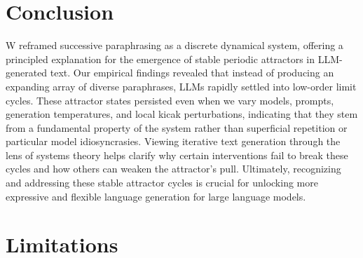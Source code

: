 \section{Conclusion}



W reframed successive paraphrasing as a discrete dynamical system, offering a principled explanation for the emergence of stable periodic attractors in LLM-generated text. 
Our empirical findings revealed that instead of producing an expanding array of diverse paraphrases, LLMs rapidly settled into low-order limit cycles. 
These attractor states persisted even when we vary models, prompts, generation temperatures, and local kicak perturbations, indicating that they stem from a fundamental property of the system rather than superficial repetition or particular model idiosyncrasies.
Viewing iterative text generation through the lens of systems theory helps clarify why certain interventions fail to break these cycles and how others can weaken the attractor’s pull. 
Ultimately, recognizing and addressing these stable attractor cycles is crucial for unlocking more expressive and flexible language generation for large language models.
% 

\newpage
\section*{Limitations}

